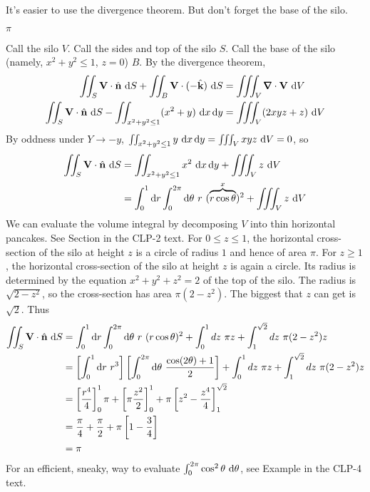 \begin{hint}
It's easier to use the divergence theorem.
But don't forget the base of the silo. 
\end{hint}

\begin{answer} 
$\pi$
\end{answer}

\begin{solution} 
Call the silo $V$.
Call the sides and top of the silo $S$. Call the base of the silo (namely,
$x^2+y^2\le 1$, $z=0$) $B$. By the divergence theorem,
\begin{align*}
\dblInt_S \vV\cdot\hn\ \dee{S} + \dblInt_B \vV\cdot(-\hk)\ \dee{S}
&=\tripInt_V\vnabla\cdot\vV\ \dee{V}\\
\dblInt_S \vV\cdot\hn\ \dee{S} 
        - \dblInt_{x^2+y^2\le 1} (x^2+y)\ \dee{x}\,\dee{y}
&=\tripInt_V(2xyz+z)\ \dee{V}\\
\end{align*}
By oddness under $Y\rightarrow -y$,
 $\iint_{x^2+y^2\le 1} y\ \mathrm{d}x\,\mathrm{d}y 
        = \iiint_V xyz\ \mathrm{d}V=0$, so
\begin{align*}
\dblInt_S \vV\cdot\hn\ \dee{S}
&=\dblInt_{x^2+y^2\le 1} x^2\ \dee{x}\,\dee{y} +\tripInt_V z\ \dee{V} \\
&=\int_0^1 \dee{r}\int_0^{2\pi}\dee{\theta}\ r\ (\overbrace{r\cos\theta}^{x})^2 
           +\tripInt_V z\ \dee{V}
\end{align*}
We can evaluate the volume integral by decomposing $V$
into thin horizontal pancakes. See Section 
in the CLP-2 text.
For $0\le z\le 1$, the horizontal cross-section of the silo at height
$z$ is a circle of radius $1$ and hence of area $\pi$. For $z\ge1$,
the horizontal cross-section of the silo at height $z$ is again a 
circle. Its radius is determined by the equation $x^2+ y^2+ z^2 = 2$ of
the top of the silo. The radius is $\sqrt{2-z^2}$, so the cross-section
has area $\pi(2-z^2)$. The biggest that $z$ can get is $\sqrt{2}$. Thus
\begin{align*}
\dblInt_S \vV\cdot\hn\ \dee{S}
&=\int_0^1 \dee{r}\int_0^{2\pi}\dee{\theta} \ r\ (r\cos\theta)^2+\int_0^1 dz\ \pi z
+\int_1^{\sqrt{2}}dz\ \pi(2-z^2) z\\
&=\left[\int_0^1 \dee{r}\ r^3\right]
   \left[\int_0^{2\pi}\dee{\theta} \ \frac{\cos(2\theta)+1}{2}\right]+\int_0^1 dz\ \pi z
+\int_1^{\sqrt{2}}dz\ \pi(2-z^2) z\\
&=\left[\frac{r^4}{4}\right]_0^1\pi
 +\left[\pi\frac{z^2}{2}\right]_0^1
 +\pi\left[z^2-\frac{z^4}{4}\right]_1^{\sqrt{2}}\\
&=\frac{\pi}{4}+\frac{\pi}{2}+\pi\left[1-\frac{3}{4}\right]\\
&=\pi
\end{align*}
For an efficient, sneaky, way to evaluate 
$\int_0^{2\pi} \cos^2 \theta\ \mathrm{d}\theta$, see Example
 in the CLP-4 text.
\end{solution}

